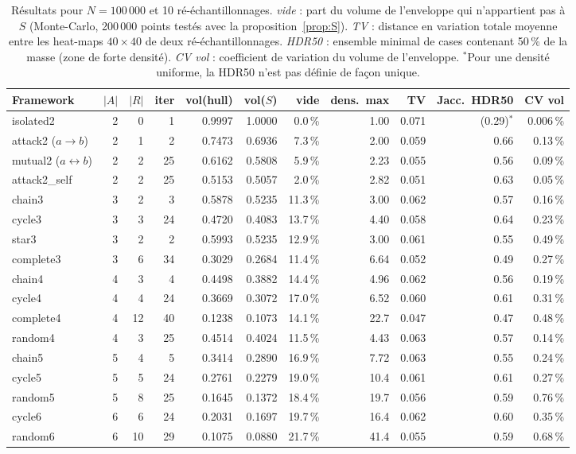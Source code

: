 \documentclass[10pt,a4paper]{article}
\theoremstyle{remark}
\begin{document}
\begin{table}[H]
\centering\footnotesize
\setlength{\tabcolsep}{4pt}
\begin{tabular}{lrrrrrrrrrr}
\toprule
Framework & $|A|$ & $|R|$ & iter & vol(hull) & vol($S$) & vide & dens.\ max & TV & Jacc.\ HDR50 & CV vol \\
\midrule
isolated2 & 2 & 0 & 1 & 0.9997 & 1.0000 & 0.0\,\% & 1.00 & 0.071 & (0.29)$^*$ & 0.006\,\% \\
attack2 ($a\to b$) & 2 & 1 & 2 & 0.7473 & 0.6936 & 7.3\,\% & 2.00 & 0.059 & 0.66 & 0.13\,\% \\
mutual2 ($a\leftrightarrow b$) & 2 & 2 & 25 & 0.6162 & 0.5808 & 5.9\,\% & 2.23 & 0.055 & 0.56 & 0.09\,\% \\
attack2\_self & 2 & 2 & 25 & 0.5153 & 0.5057 & 2.0\,\% & 2.82 & 0.051 & 0.63 & 0.05\,\% \\
\midrule
chain3 & 3 & 2 & 3 & 0.5878 & 0.5235 & 11.3\,\% & 3.00 & 0.062 & 0.57 & 0.16\,\% \\
cycle3 & 3 & 3 & 24 & 0.4720 & 0.4083 & 13.7\,\% & 4.40 & 0.058 & 0.64 & 0.23\,\% \\
star3 & 3 & 2 & 2 & 0.5993 & 0.5235 & 12.9\,\% & 3.00 & 0.061 & 0.55 & 0.49\,\% \\
complete3 & 3 & 6 & 34 & 0.3029 & 0.2684 & 11.4\,\% & 6.64 & 0.052 & 0.49 & 0.27\,\% \\
\midrule
chain4 & 4 & 3 & 4 & 0.4498 & 0.3882 & 14.4\,\% & 4.96 & 0.062 & 0.56 & 0.19\,\% \\
cycle4 & 4 & 4 & 24 & 0.3669 & 0.3072 & 17.0\,\% & 6.52 & 0.060 & 0.61 & 0.31\,\% \\
complete4 & 4 & 12 & 40 & 0.1238 & 0.1073 & 14.1\,\% & 22.7 & 0.047 & 0.47 & 0.48\,\% \\
random4 & 4 & 3 & 25 & 0.4514 & 0.4024 & 11.5\,\% & 4.43 & 0.063 & 0.57 & 0.14\,\% \\
\midrule
chain5 & 5 & 4 & 5 & 0.3414 & 0.2890 & 16.9\,\% & 7.72 & 0.063 & 0.55 & 0.24\,\% \\
cycle5 & 5 & 5 & 24 & 0.2761 & 0.2279 & 19.0\,\% & 10.4 & 0.061 & 0.61 & 0.27\,\% \\
random5 & 5 & 8 & 25 & 0.1645 & 0.1372 & 18.4\,\% & 19.7 & 0.056 & 0.59 & 0.76\,\% \\
\midrule
cycle6 & 6 & 6 & 24 & 0.2031 & 0.1697 & 19.7\,\% & 16.4 & 0.062 & 0.60 & 0.35\,\% \\
random6 & 6 & 10 & 29 & 0.1075 & 0.0880 & 21.7\,\% & 41.4 & 0.055 & 0.59 & 0.68\,\% \\
\bottomrule
\end{tabular}
\caption{Résultats pour $N=100\,000$ et 10 ré-échantillonnages. \emph{vide} : part du volume
de l'enveloppe qui n'appartient pas à $S$ (Monte-Carlo, 200\,000 points testés avec la
proposition~\ref{prop:S}). \emph{TV} : distance en variation totale moyenne entre les heat-maps
$40\times40$ de deux ré-échantillonnages. \emph{HDR50} : ensemble minimal de cases contenant
50\,\% de la masse (zone de forte densité). \emph{CV vol} : coefficient de variation du volume
de l'enveloppe. $^*$Pour une densité uniforme, la HDR50 n'est pas définie de façon unique.}
\label{tab:res}
\end{table}
\end{document}
